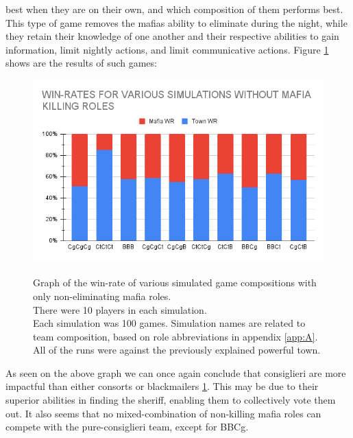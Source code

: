 best when they are on their own, and which composition of them performs best.
This type of game removes the mafias ability to eliminate during the night, while
they retain their knowledge of one another and their respective abilities to
gain information, limit nightly actions, and limit communicative actions. Figure \ref{fig:VariousSimulationsNonKilling} shows
are the results of such games:
\begin{figure}[H]
    \includegraphics[width=1\linewidth]{figures/Winrates_NonKilling}
    \caption{\\Graph of the win-rate of various simulated game compositions
        with only non-eliminating mafia roles.\\
        There were 10 players in each simulation.\\
        Each simulation was 100 games.
        Simulation names are related to team composition, based on role
        abbreviations in appendix \ref{app:A}.\\
        All of the runs were against the previously explained powerful town.}
    \label{fig:VariousSimulationsNonKilling}
\end{figure}
\vspace{-5px} As seen on the above graph we can once again conclude that
consiglieri are more impactful than either consorts or blackmailers \ref{fig:VariousSimulationsNonKilling}. This may
be due to their superior abilities in finding the sheriff, enabling them to
collectively vote them out. It also seems that no mixed-combination of
non-killing mafia roles can compete with the pure-consiglieri team, except for BBCg.

